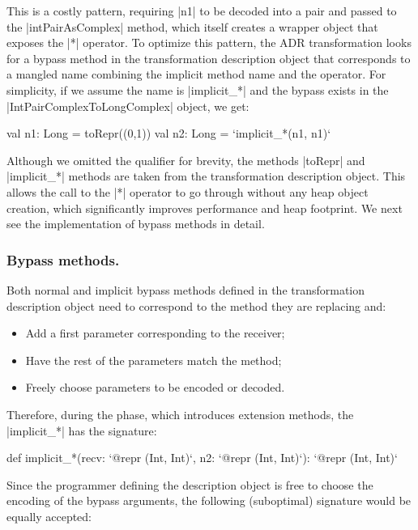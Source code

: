This is a costly pattern, requiring |n1| to be decoded into a pair and passed to the |intPairAsComplex| method, which itself creates a wrapper object that exposes the |*| operator. To optimize this pattern, the ADR transformation looks for a bypass method in the transformation description object that corresponds to a mangled name combining the implicit method name and the operator. For simplicity, if we assume the name is |implicit_*| and the bypass exists in the |IntPairComplexToLongComplex| object, we get:

\begin{lstlisting-nobreak}
val n1: Long = toRepr((0,1))
val n2: Long = `implicit_*(n1, n1)`
\end{lstlisting-nobreak}

Although we omitted the qualifier for brevity, the methods |toRepr| and |implicit_*| methods are taken from the transformation description object. This allows the call to the |*| operator to go through without any heap object creation, which significantly improves performance and heap footprint. We next see the implementation of bypass methods in detail.

\subsubsection{Bypass methods.} Both normal and implicit bypass methods defined in the transformation description object need to correspond to the method they are replacing and:
\begin{itemize}
\item Add a first parameter corresponding to the receiver;
\item Have the rest of the parameters match the method;
\item Freely choose parameters to be encoded or decoded.
\end{itemize}

Therefore, during the \coerce{} phase, which introduces extension methods, the |implicit_*| has the signature:

\begin{lstlisting-nobreak}
def implicit_*(recv: `@repr (Int, Int)`,  n2: `@repr (Int, Int)`): `@repr (Int, Int)`
\end{lstlisting-nobreak}

Since the programmer defining the description object is free to choose the encoding of the bypass arguments, the following (suboptimal) signature would be equally accepted:

